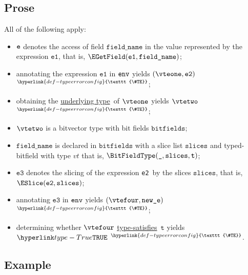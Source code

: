 \documentclass{book}
\newcommand\TypeErrorConfig[0]{\hyperlink{def-typeerrorconfig}{\texttt{\#TE}}}
\newcommand\ProseOrTypeError[0]{\hyperlink{def-proseortypeerror}{$^{\TypeErrorConfig}$}}
\newcommand\underlyingtype[0]{\hyperlink{def-underlyingtype}{underlying type}}
\newcommand\typesatisfies[0]{\hyperlink{def-typesatisfies}{type-satisfies}}
\newcommand\vt[0]{\texttt{t}}
\newcommand\veone[0]{\texttt{e1}}
\newcommand\vetwo[0]{\texttt{e2}}
\newcommand\vethree[0]{\texttt{e3}}
\newcommand\bitfields[0]{\texttt{bitfields}}
\newcommand\fieldname[0]{\texttt{field\_name}}
\newcommand\slices[0]{\texttt{slices}}
\newcommand\newe[0]{\texttt{new\_e}}
\begin{document}
\subsection{Prose}
All of the following apply:
\begin{itemize}
  \item $\texttt{e}$ denotes the access of field $\fieldname$ in the value represented by the expression $\veone$, that is, $\EGetField(\veone, \fieldname)$;
  \item annotating the expression $\veone$ in $\texttt{env}$ yields $(\vteone, \vetwo)$ \ProseOrTypeError;
  \item obtaining the \underlyingtype\ of $\vteone$ yields $\vtetwo$ \ProseOrTypeError;
  \item $\vtetwo$ is a bitvector type with bit fields $\bitfields$;
  \item $\fieldname$ is declared in $\bitfields$ with a slice list $\slices$ and typed-bitfield with type $vt$ that is,
        $\BitFieldType(\Ignore, \slices, \vt)$;
  \item $\vethree$ denotes the slicing of the expression \vetwo\ by the slices $\slices$, that is, \\ $\ESlice(\vetwo, \slices)$;
  \item annotating $\vethree$ in $\texttt{env}$ yields $(\vtefour, \newe)$ \ProseOrTypeError;
  \item determining whether $\vtefour$ \typesatisfies\ $\vt$ yields $\True$ \ProseOrTypeError.
\end{itemize}

\subsection{Example}

\end{document}
